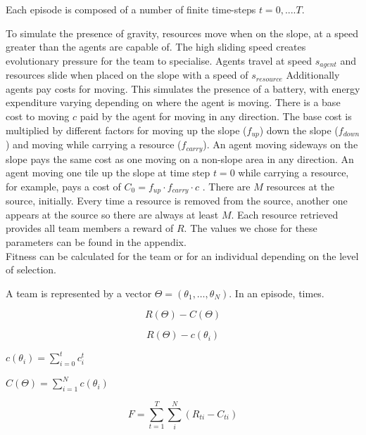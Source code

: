 \documentclass[12pt]{article}  %
\begin{document}
Each episode is composed of a number of finite time-steps $t=0, .... T$. 




To simulate the presence of gravity, resources move when on the slope, at a speed greater than the agents are capable of.
The high sliding speed creates evolutionary pressure for the team to specialise.
Agents travel at speed $s_{agent}$ and resources slide when placed on the slope with a speed of $s_{resource}$ 
Additionally agents pay costs for moving.
This simulates the presence of a battery, with energy expenditure varying depending on where the agent is moving.
There is a base cost to moving $c$ paid by the agent for moving in any direction.
The base cost is multiplied by different factors for moving up the slope ($f_{up}$) down the slope ($f_{down}$) and moving while carrying a resource ($f_{carry}$). 
An agent moving sideways on the slope pays the same cost as one moving on a non-slope area in any direction.
An agent moving one tile up the slope at time step $t=0$ while carrying a resource, for example, pays a cost of $C_{0} = f_{up} \cdot f_{carry} \cdot c$ .
There are $M$ resources at the source, initially.
Every time a resource is removed from the source, another one appears at the source so there are always at least $M$.
Each resource retrieved provides all team members a reward of $R$.
The values we chose for these parameters can be found in the appendix.\\

Fitness can be calculated for the team or for an individual depending on the level of selection.

A team is represented by a vector $\Theta = (\theta_1, \dots, \theta_N)$. In an episode, times.

$$R(\Theta) - C(\Theta)$$

$$R(\Theta) - c(\theta_i)$$


$c(\theta_i) = \sum_{i=0}^{t} c^{t}_{i}$

$C(\Theta) = \sum_{i=1}^{N} c(\theta_i) $

\begin{equation}
  F = \sum_{t=1}^{T} \sum_{i}^{N} (R_{ti} - C_{ti})  
  \label{eq:fitness_team}
\end{equation}

\end{document}
